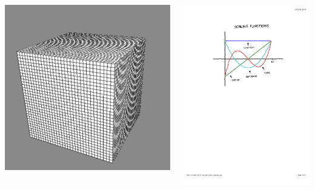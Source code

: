 \begin{frame}
\begin{columns}
\begin{column}[b]{0.55\linewidth}
	\includegraphics[scale=0.2]{figures/unifgrid.pdf}
    \end{column}
    \begin{column}[b]{0.45\linewidth}
	\centering
	\includegraphics[scale=0.3, clip, viewport = 150 450 450 750]{figures/scaling.pdf}\\

\end{column}
\end{columns}
\end{frame}

